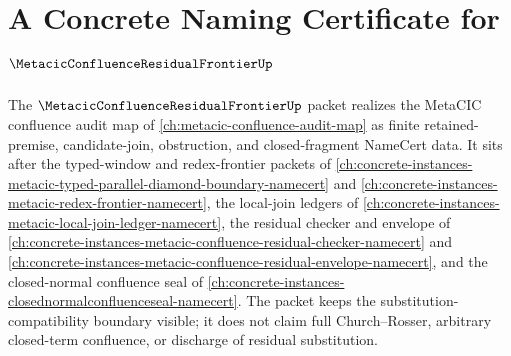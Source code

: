 \chapter{A Concrete Naming Certificate for $\MetacicConfluenceResidualFrontierUp$}
\label{ch:concrete-instances-metacic-confluence-residual-frontier-namecert}

The $\MetacicConfluenceResidualFrontierUp$ packet realizes the MetaCIC confluence audit map of \autoref{ch:metacic-confluence-audit-map} as finite retained-premise, candidate-join, obstruction, and closed-fragment NameCert data. It sits after the typed-window and redex-frontier packets of \autoref{ch:concrete-instances-metacic-typed-parallel-diamond-boundary-namecert} and \autoref{ch:concrete-instances-metacic-redex-frontier-namecert}, the local-join ledgers of \autoref{ch:concrete-instances-metacic-local-join-ledger-namecert}, the residual checker and envelope of \autoref{ch:concrete-instances-metacic-confluence-residual-checker-namecert} and \autoref{ch:concrete-instances-metacic-confluence-residual-envelope-namecert}, and the closed-normal confluence seal of \autoref{ch:concrete-instances-closednormalconfluenceseal-namecert}. The packet keeps the substitution-compatibility boundary visible; it does not claim full Church--Rosser, arbitrary closed-term confluence, or discharge of residual substitution.

